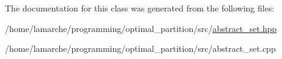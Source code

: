 The documentation for this class was generated from the following files\-:\begin{DoxyCompactItemize}
\item 
/home/lamarche/programming/optimal\-\_\-partition/src/\hyperlink{abstract__set_8hpp}{abstract\-\_\-set.\-hpp}\item 
/home/lamarche/programming/optimal\-\_\-partition/src/abstract\-\_\-set.\-cpp\end{DoxyCompactItemize}
